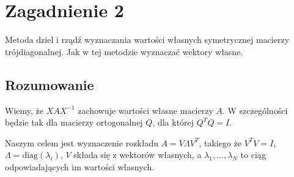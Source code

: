 \documentclass[a4paper,12pt]{article}
\begin{document}
\newpage
\section*{Zagadnienie 2}
Metoda dziel i rządź wyznaczania wartości własnych symetrycznej macierzy trójdiagonalnej. Jak w tej metodzie wyznaczać wektory własne.

\subsection*{Rozumowanie}

Wiemy, że $X A X^{-1}$ zachowuje wartości własne macierzy $A$. W szczególności będzie tak dla macierzy ortogonalnej $Q$, dla której $Q^T Q = I$.

Naszym celem jest wyznaczenie rozkładu $A = V\Lambda V^T$, takiego że $V^T V = I$, $\Lambda = \text{diag}(\lambda_i)$,
$V$ składa się z wektorów własnych, a $\lambda_1, \dots, \lambda_N$ to ciąg odpowiadających im wartości własnych.
\end{document}

